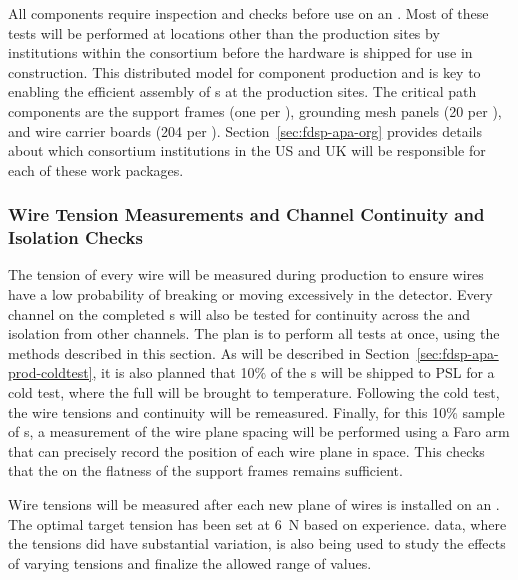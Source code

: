 All components require inspection and  checks before use on an .  Most of these tests will be performed at locations other than the  production sites by institutions within the consortium before the hardware is shipped for use in  construction. This distributed model for component production and  is key to enabling the efficient assembly of s at the production sites.   The critical path components are the support frames (one per ), grounding mesh panels (20 per ), and wire carrier boards (204 per ). Section~\ref{sec:fdsp-apa-org} provides details about which consortium institutions in the US and UK will be responsible for each of these work packages.  

\subsubsection{Wire Tension Measurements and Channel Continuity and Isolation Checks}
\label{sec:fdsp-apa-prod-qa-tension}

The tension of every wire will be measured during production to ensure wires have a low probability of breaking or moving excessively in the detector.  Every channel on the completed s will also be tested for continuity across the  and isolation from other channels.  The plan is to perform all tests at once, using the methods described in this section.  As will be described in Section~\ref{sec:fdsp-apa-prod-coldtest}, it is also planned that 10$\%$ of the s will be shipped to PSL for a cold test, where the full  will be brought to  temperature. Following the cold test, the wire tensions and continuity will be remeasured.  Finally, for this 10$\%$ sample of s, a measurement of the wire plane spacing will be performed using a Faro arm that can precisely record the position of each wire plane in space. This checks that the  on the flatness of the support frames remains sufficient.  

Wire tensions will be measured after each new plane of wires is installed on an . The optimal target tension has been set at \SI{6}{N} based on  experience.   data, where the tensions did have substantial variation, is also being used to study the effects of varying tensions and finalize the allowed range of values.  


